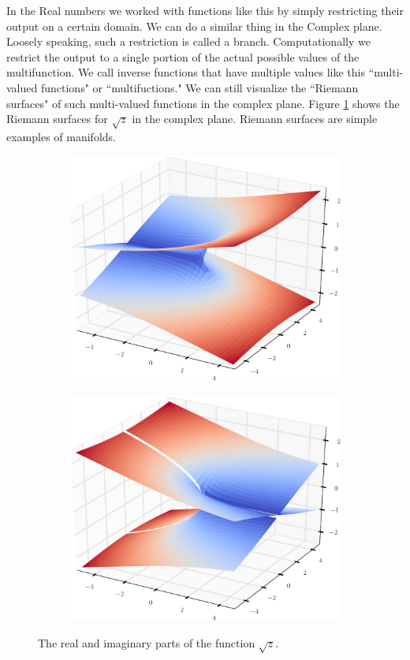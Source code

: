 In the Real numbers we worked with functions like this by simply restricting their output on a certain domain.
We can do a similar thing in the Complex plane.
Loosely speaking, such a restriction is called a branch.
Computationally we restrict the output to a single portion of the actual possible values of the multifunction.
We call inverse functions that have multiple values like this ``multi-valued functions" or ``multifuctions."
We can still visualize the ``Riemann surfaces" of such multi-valued functions in the complex plane.
Figure \ref{fig:sqrt_riemann_surface} shows the Riemann surfaces for $\sqrt{z}$ in the complex plane.
Riemann surfaces are simple examples of manifolds.

\begin{figure}
\begin{subfigure}{.49\textwidth}
\includegraphics[width=\textwidth]{sqrt_riemann_surface_1}
\end{subfigure}
\begin{subfigure}{.49\textwidth}
\includegraphics[width=\textwidth]{sqrt_riemann_surface_2}
\end{subfigure}
\caption{The real and imaginary parts of the function $\sqrt{z}$.}
\label{fig:sqrt_riemann_surface}
\end{figure}

